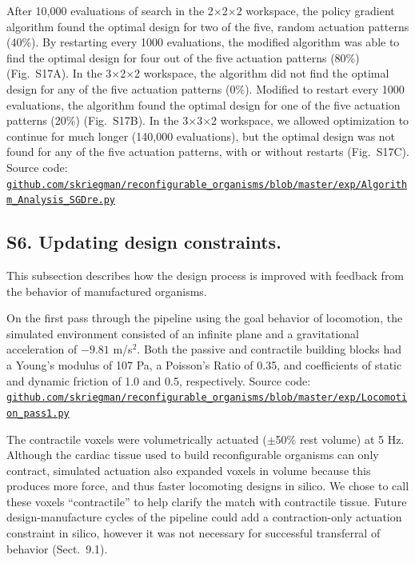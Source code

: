 After 10,000 evaluations of search in the 2{$\times$}2{$\times$}2 workspace, the policy gradient algorithm found the optimal design for two of the five, random actuation patterns (40\%). By restarting every 1000 evaluations, the modified algorithm was able to find the optimal design for four out of the five actuation patterns (80\%) (Fig.~S17A). In the 3{$\times$}2{$\times$}2 workspace, the algorithm did not find the optimal design for any of the five actuation patterns (0\%). Modified to restart every 1000 evaluations, the algorithm found the optimal design for one of the five actuation patterns (20\%) (Fig.~S17B). In the 3{$\times$}3{$\times$}2 workspace, we allowed optimization to continue for much longer (140,000 evaluations), but the optimal design was not found for any of the five actuation patterns, with or without restarts (Fig.~S17C). Source code: 
\href{https://github.com/skriegman/reconfigurable_organisms/blob/master/exp/Algorithm_Analysis_SGDre.py}{\scriptsize\tt\color{blue}github.com/skriegman/reconfigurable\_organisms/blob/master/exp/Algorithm\_Analysis\_SGDre.py}

\vspace{1em} 


\subsection*{S6. Updating design constraints.}

This subsection describes how the design process is improved with feedback from the behavior of manufactured organisms. 

\vspace{1em}

On the first pass through the pipeline using the goal behavior of locomotion, the simulated environment consisted of an infinite plane and a gravitational acceleration of $-9.81$ m/s$^2$. 
Both the passive and contractile building blocks had a Young's modulus of 107 Pa, a Poisson's Ratio of 0.35, and coefficients of static and dynamic friction of 1.0 and 0.5, respectively. 
Source code: \\
\href{https://github.com/skriegman/reconfigurable_organisms/blob/master/exp/Locomotion_pass1.py}{\scriptsize\tt\color{blue}github.com/skriegman/reconfigurable\_organisms/blob/master/exp/Locomotion\_pass1.py}

\vspace{1em} 


The contractile voxels were volumetrically actuated ({$\pm$}50\% rest volume) at 5 Hz. 
Although the cardiac tissue used to build reconfigurable organisms can only contract, simulated actuation also expanded voxels in volume because this produces more force, and thus faster locomoting designs in silico. 
We chose to call these voxels ``contractile'' to help clarify the match with contractile tissue. 
Future design-manufacture cycles of the pipeline could add a contraction-only actuation constraint in silico, however it was not necessary for successful transferral of behavior (Sect.~9.1).

